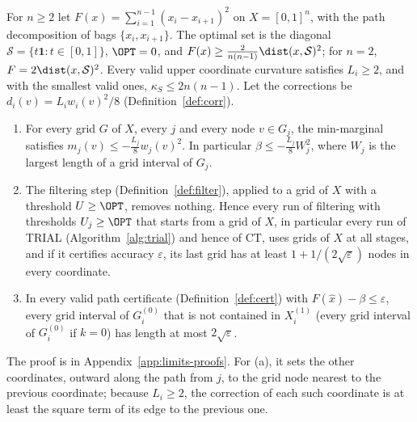 \begin{proposition}\label{lim:prop:setgrowth}
For $n\ge2$ let $F(x)=\sum_{i=1}^{n-1}(x_i-x_{i+1})^2$ on $X=[0,1]^n$, with
the path decomposition of bags $\{x_i,x_{i+1}\}$. The optimal set is the
diagonal $\mathcal S=\{t\mathbf1:t\in[0,1]\}$, $\OPT=0$, and
$F(x)\ge\frac2{n(n-1)}\dist(x,\mathcal S)^2$; for $n=2$,
$F=2\dist(x,\mathcal S)^2$. Every valid upper coordinate curvature satisfies
$L_i\ge2$, and with the smallest valid ones, $\kappa_S\le2n(n-1)$. Let the
corrections be $d_i(v)=L_iw_i(v)^2/8$ (Definition~\ref{def:corr}).
\begin{enumerate}[label=(\alph*)]
\item For every grid $G$ of $X$, every $j$ and every node $v\in G_j$, the
  min-marginal satisfies $m_j(v)\le-\frac{L_j}8w_j(v)^2$. In particular
  $\beta\le-\frac{L_j}8W_j^2$, where $W_j$ is the largest length of a grid
  interval of $G_j$.
\item The filtering step (Definition~\ref{def:filter}), applied to a grid
  of $X$ with a threshold $U\ge\OPT$, removes nothing. Hence every run of
  filtering with thresholds $U_j\ge\OPT$ that starts from a grid of $X$, in
  particular every run of TRIAL (Algorithm~\ref{alg:trial}) and hence of CT,
  uses grids of $X$ at all stages, and if it certifies accuracy
  $\varepsilon$, its last grid has at least $1+1/(2\sqrt\varepsilon)$ nodes
  in every coordinate.
\item In every valid path certificate (Definition~\ref{def:cert}) with
  $F(\hat x)-\beta\le\varepsilon$, every grid interval of $G^{(0)}_i$ that is
  not contained in $X^{(1)}_i$ (every grid interval of $G^{(0)}_i$ if $k=0$)
  has length at most $2\sqrt\varepsilon$.
\end{enumerate}
\end{proposition}

The proof is in Appendix~\ref{app:limits-proofs}. For (a), it sets the
other coordinates, outward along the path from $j$, to the grid node nearest
to the previous coordinate; because $L_i\ge2$, the correction of each such
coordinate is at least the square term of its edge to the previous one.

